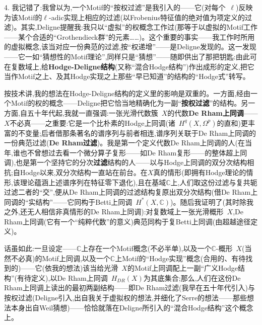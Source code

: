 4. 我记错了:我曾以为,一个Motif的“按权过滤”是我引入的——它(对每个~$\ell$)反映为该Motif的$\ell$-adic实现上相应的过滤(以Frobenius特征值的绝对值为项定义的过滤)。其实,Deligne提醒我:我只以“虚拟”的权概念工作过(那等于以虚拟的Motif工作——某个合适的“Grothendieck群”的元素……)。这个重要的事实——我工作时所用的虚拟概念,该当对应一份典范的过滤,按“权递增”——是Deligne发现的。这一发现——它一如“猜想性的Motif理论”,同样只是“猜想”——随即供出了那把钥匙:由此可在复数域上,给\textbf{Hodge-Deligne结构}(又称“混合Hodge结构”)作出成形的定义,把它当作Motif之上、及其Hodge实现之上那些“早已知道”的结构的“Hodge式”转写。

\dmark{}按技术讲,我的想法在Hodge-Deligne结构的定义里的影响是双重的。一方面,经由一个Motif的权的概念——Deligne把它恰当地精确化为一副“\textbf{按权过滤}”的结构。另一方面,自五十年代起,我就一直强调:一张光滑代数簇~$X$的代数\textbf{De Rham上同调}——$X$不必真——之重要:它是一个比朴素的Hodge上同调(诸~$H^q(X,\Omega^p)$的直和)更丰富的不变量;后者借那条著名的谱序列与前者相连,谱序列关联于De Rham上同调的一份典范过滤(\textbf{De Rham过滤})。我是第一个定义代数De Rham上同调的人(在当年,谁也不曾想过去看一个微分算子复形——如De Rham复形——的整体超上同调),也是第一个坚持它的分次\textbf{过滤}结构的人——以与Hodge上同调的双分次结构相抗;自Hodge以来,双分次结构一直站在前台。在$X$真的情形(即拥有Hodge理论的情形,该理论蕴涵上述谱序列在特征零下退化),且在基域$\mathbb{C}$上,人们取这份过滤与复共轭过滤二者的“交”,便从De Rham上同调的过滤结构复原出双分次结构(借De Rham上同调的“实结构”——它同构于Betti上同调~$H^*(X,\mathbb{C})$)。随后我证明了(其时除我之外,还无人相信非真情形的De Rham上同调):对复数域上一张光滑概形~$X$,De Rham上同调(它有一个“纯粹代数”的意义)典范同构于复Betti上同调(由超越途径定义)。

话虽如此:一旦设定——$\mathbb{C}$上存在一个Motif概念(不必半单),以及一个$\mathbb{C}$-概形~$X$(当然不必真)的Motif上同调,以及一个$\mathbb{C}$上Motif的“Hodge实现”概念(合用的、有待找到的)——它(依我的想法)该当给光滑~$X$的Motif上同调配上一副“广义Hodge结构”(有待定义),以De Rham上同调~$H_{DR}(X)$为其底集合;那么,人们在这份De Rham上同调上读出的最初两副结构——即De Rham过滤(我早在五十年代引入)与按权过滤(Deligne引入,出自我关于虚拟权的想法,并细化了Serre的想法——那些想法本身出自Weil猜想)——恰恰就落在Deligne所引入的“混合Hodge结构”这个概念上。

